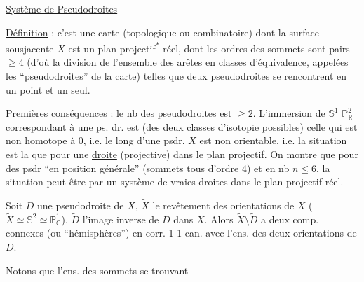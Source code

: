 \uline{Système de Pseudodroites}

\uline{Définition} : c'est une carte (topologique ou combinatoire)
dont la surface sousjacente $X$ est un plan projectif\textsuperscript{*}
réel, dont les ordres des sommets sont pairs $\geq4$ (d'où
la division de l'ensemble des arêtes en classes
d'équivalence, appelées les ``pseudodroites'' de la
carte) telles que deux pseudodroites se rencontrent
en un point et un seul.

\uline{Premières conséquences} : le nb  des pseudodroites est $\geq2$.
L'immersion de $\mathbb{S}^1$  $\mathbb{P}_{\mathbb{R}}^2$ correspondant à une
ps. dr. est (des deux classes d'isotopie possibles) celle
qui est non homotope à  $0$, i.e. le long d'une
psdr. $X$ est non orientable, i.e. la situation est la
 que pour une \uline{droite} (projective) dans le plan
projectif. On montre que pour des psdr ``en
position générale'' (sommets tous d'ordre 4) et
en nb $n\leq6$, la situation peut être  par
un système de vraies droites dans le plan
projectif réel.

Soit $D$ une pseudodroite de $X$, $\widetilde X$ le revêtement des
orientations de $X$ ($\widetilde X\simeq\mathbb{S}^2\simeq\mathbb{P}_{\mathbb{C}}^1$), $\widetilde D$ l'image inverse
de $D$ dans $X$. Alors $\widetilde X\setminus\widetilde D$ a deux comp.
connexes (ou ``hémisphères'') en corr. 1-1 can.
avec l'ens. des deux orientations de $D$.

Notons que  l'ens. des sommets se trouvant
